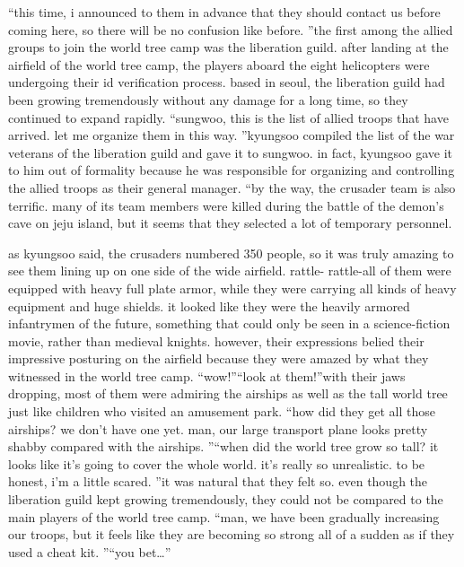“this time, i announced to them in advance that they should contact us before coming here, so there will be no confusion like before.
”the first among the allied groups to join the world tree camp was the liberation guild.
 after landing at the airfield of the world tree camp, the players aboard the eight helicopters were undergoing their id verification process.
based in seoul, the liberation guild had been growing tremendously without any damage for a long time, so they continued to expand rapidly.
“sungwoo, this is the list of allied troops that have arrived.
 let me organize them in this way.
”kyungsoo compiled the list of the war veterans of the liberation guild and gave it to sungwoo.
 in fact, kyungsoo gave it to him out of formality because he was responsible for organizing and controlling the allied troops as their general manager.
“by the way, the crusader team is also terrific.
 many of its team members were killed during the battle of the demon’s cave on jeju island, but it seems that they selected a lot of temporary personnel.


as kyungsoo said, the crusaders numbered 350 people, so it was truly amazing to see them lining up on one side of the wide airfield.
rattle- rattle-all of them were equipped with heavy full plate armor, while they were carrying all kinds of heavy equipment and huge shields.
it looked like they were the heavily armored infantrymen of the future, something that could only be seen in a science-fiction movie, rather than medieval knights.
however, their expressions belied their impressive posturing on the airfield because they were amazed by what they witnessed in the world tree camp.
“wow!”“look at them!”with their jaws dropping, most of them were admiring the airships as well as the tall world tree just like children who visited an amusement park.
“how did they get all those airships? we don’t have one yet.
 man, our large transport plane looks pretty shabby compared with the airships.
”“when did the world tree grow so tall? it looks like it’s going to cover the whole world.
 it’s really so unrealistic.
 to be honest, i’m a little scared.
”it was natural that they felt so.
 even though the liberation guild kept growing tremendously, they could not be compared to the main players of the world tree camp.
“man, we have been gradually increasing our troops, but it feels like they are becoming so strong all of a sudden as if they used a cheat kit.
”“you bet…”

 